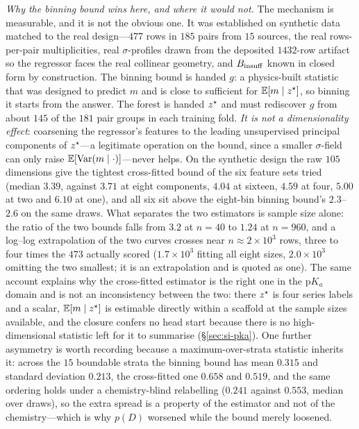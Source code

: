 \emph{Why the binning bound wins here, and where it would not.} The mechanism is measurable, and it is
not the obvious one. It was established on synthetic data matched to the real
design---$477$ rows in $185$ pairs from $15$ sources, the real rows-per-pair multiplicities, real
$\sigma$-profiles drawn from the deposited $1432$-row artifact so the regressor faces the real
collinear geometry, and $B_{\mathrm{insuff}}$ known in closed form by construction. The binning bound is handed
$g$: a physics-built statistic that was designed to predict $m$ and is close to sufficient for
$\mathbb{E}[m\mid z^\star]$, so binning it starts from the answer. The forest is handed $z^\star$ and must
rediscover $g$ from about $145$ of the $181$ pair groups in each training fold. \emph{It is not a
dimensionality effect}: coarsening the regressor's features to the leading unsupervised principal
components of $z^\star$---a legitimate operation on the bound, since a smaller $\sigma$-field can
only raise $\mathbb{E}[\mathrm{Var}(m\mid\cdot)]$---never helps. On the synthetic design the raw $105$ dimensions
give the tightest cross-fitted bound of the six feature sets tried (median $3.39$, against $3.71$ at
eight components, $4.04$ at sixteen, $4.59$ at four, $5.00$ at two and $6.10$ at one), and all six
sit above the eight-bin binning bound's $2.3$--$2.6$ on the same draws. What separates the two
estimators is sample size alone: the ratio of the two bounds falls from $3.2$ at $n{=}40$ to $1.24$
at $n{=}960$, and a log--log extrapolation of the two curves crosses near $n\approx2\times10^3$
rows, three to four times the $473$ actually scored ($1.7\times10^3$ fitting all eight sizes,
$2.0\times10^3$ omitting the two smallest; it is an extrapolation and is quoted as one). The same
account explains why the cross-fitted estimator is the right one in the $\mathrm pK_a$ domain and is not an
inconsistency between the two: there $z^\star$ is four series labels and a scalar, $\mathbb{E}[m\mid z^\star]$
is estimable directly within a scaffold at the sample sizes available, and the closure confers no
head start because there is no high-dimensional statistic left for it to summarise
(\S\ref{sec:si-pka}). One further asymmetry is worth recording because a maximum-over-strata
statistic inherits it: across the $15$ boundable strata the binning bound has mean $0.315$ and
standard deviation $0.213$, the cross-fitted one $0.658$ and $0.519$, and the same ordering holds
under a chemistry-blind relabelling ($0.241$ against $0.553$, median over draws), so the extra
spread is a property of the estimator and not of the chemistry---which is why $p(D)$ worsened while
the bound merely loosened.

